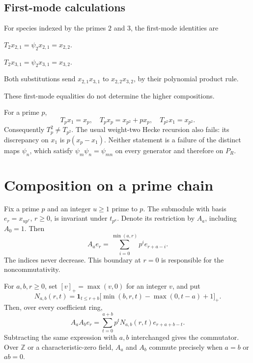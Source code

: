 \subsection{First-mode calculations}
\label{v4-arith:gb:explicit-psi-2}
For species indexed by the primes \(2\) and \(3\), the first-mode identities are
\begin{computation}
\label{v4-arith:comp:psi2-a2}
\(T_2x_{2,1}=\psi_2x_{2,1}=x_{2,2}\).
\end{computation}
\begin{computation}
\label{v4-arith:comp:psi2-a3}
\(T_2x_{3,1}=\psi_2x_{3,1}=x_{3,2}\).
\end{computation}
\begin{computation}
\label{v4-arith:comp:psi2-a2a3}
Both substitutions send \(x_{2,1}x_{3,1}\) to
\(x_{2,2}x_{3,2}\), by their polynomial product rule.
\end{computation}
These first-mode equalities do not determine the higher compositions.

\begin{example}
For a prime \(p\),
\[
 T_p x_1=x_p,\quad T_p x_p=x_{p^2}+p x_p,\quad
 T_{p^2}x_1=x_{p^2}.
\]
Consequently \(T_p^2\ne T_{p^2}\). The usual weight-two Hecke recursion
also fails: its discrepancy on \(x_1\) is
\(p(x_p-x_1)\). Neither statement is a failure of the distinct maps
\(\psi_n\), which satisfy \(\psi_m\psi_n=\psi_{mn}\) on every generator
and therefore on \(P_R\).
\end{example}

\section{Composition on a prime chain}
\label{v4-arith:ado:composition}

Fix a prime \(p\) and an integer \(u\ge1\) prime to \(p\).
The submodule with basis \(e_r=x_{up^r}\), \(r\ge0\), is invariant under
\(t_{p^a}\). Denote its restriction by \(A_a\), including \(A_0=1\).
Then
\begin{equation}
\label{v4-arith:ado:prime-chain}
 A_a e_r=\sum_{i=0}^{\min(a,r)}p^i e_{r+a-i}.
\end{equation}
The indices never decrease. This boundary at \(r=0\) is responsible for
the noncommutativity.

\begin{theorem}
\label{v4-arith:ado:composition-theorem}
\label{v4-arith:lem:composition-law}
For \(a,b,r\ge0\), set \([v]_+=\max(v,0)\) for an integer \(v\), and put
\[
 N_{a,b}(r,t)=\mathbf1_{t\le r+b}
 \bigl[\min(b,r,t)-\max(0,t-a)+1\bigr]_+.
\]
Then, over every coefficient ring,
\begin{equation}
\label{v4-arith:ado:composition-formula}
 A_a A_b e_r=\sum_{t=0}^{a+b}p^tN_{a,b}(r,t)e_{r+a+b-t}.
\end{equation}
Subtracting the same expression with \(a,b\) interchanged gives the
commutator. Over \(\mathbb Z\) or a characteristic-zero field,
\(A_a\) and \(A_b\) commute precisely when \(a=b\) or \(ab=0\).
\end{theorem}

